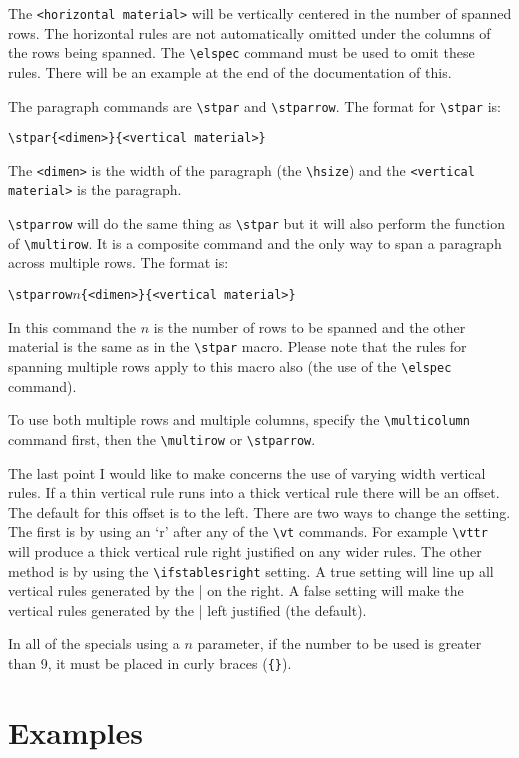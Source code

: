 \documentclass{article}
\begin{document}
The \verb|<horizontal material>| will be vertically centered in the number 
of spanned rows.  The horizontal rules are not automatically omitted under the 
columns of the rows being spanned.  The \verb|\elspec| command must be used to omit  
these rules.  There will be an example at the end of the documentation of this.

The paragraph commands are \verb|\stpar| and \verb|\stparrow|.  The format for \verb|\stpar| 
is:

\verb|\stpar{<dimen>}{<vertical material>}|

The \verb|<dimen>| is the width of the paragraph (the \verb|\hsize|) and the 
\verb|<vertical material>| is the paragraph.

\verb|\stparrow| will do the same thing as \verb|\stpar| but it will also perform the 
function of \verb|\multirow|.  It is a composite command and the only way to span a 
paragraph across multiple rows.  The format is:

\verb|\stparrow|$n$\verb|{<dimen>}{<vertical material>}|

In this command the $n$ is the number of rows to be spanned and the 
other material is the same as in the \verb|\stpar| macro.  Please note that the 
rules for spanning multiple rows apply to this macro also (the use of the 
\verb|\elspec| command).

To use both multiple rows and multiple columns, specify the \verb|\multicolumn| 
command first, then the \verb|\multirow| or \verb|\stparrow|.

The last point I would like to make concerns the use of varying width vertical 
rules.  If a thin vertical rule runs into a thick vertical rule there will 
be an offset.  The default for this offset is to the left.  There are two ways
to change the setting.  The first is by using an `r' after any of the \verb|\vt|
commands.  For example \verb|\vttr| will produce a thick vertical rule right
justified on any wider rules.  The other method is by using the 
\verb|\ifstablesright| setting.  A true setting will line up all vertical rules
generated by the \verb||| on the right.  A false setting will make the vertical 
rules generated by the \verb||| left justified (the default).

In all of the specials using a $n$ parameter, if the number to be used is 
greater than 9, it must be placed in curly braces (\verb|{}|).

\newpage
\section{Examples}
\end{document}

